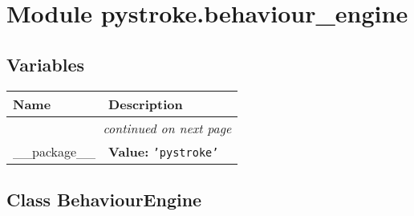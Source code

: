%
%
%


\section{Module pystroke.behaviour\_engine}

    \label{pystroke:behaviour_engine}


  \subsection{Variables}

    \vspace{-1cm}
\hspace{\varindent}\begin{longtable}{|p{\varnamewidth}|p{\vardescrwidth}|l}
\cline{1-2}
\cline{1-2} \centering \textbf{Name} & \centering \textbf{Description}& \\
\cline{1-2}
\endhead\cline{1-2}\multicolumn{3}{r}{\small\textit{continued on next page}}\\\endfoot\cline{1-2}
\endlastfoot\raggedright \_\-\_\-p\-a\-c\-k\-a\-g\-e\-\_\-\_\- & \raggedright \textbf{Value:} 
{\tt \texttt{'}\texttt{pystroke}\texttt{'}}&\\
\cline{1-2}
\end{longtable}



\subsection{Class BehaviourEngine}

